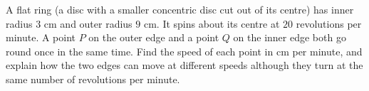 A flat ring (a disc with a smaller concentric disc cut out of its centre) has inner radius $3$ cm and outer radius $9$ cm. It spins about its centre at $20$ revolutions per minute. A point $P$ on the outer edge and a point $Q$ on the inner edge both go round once in the same time. Find the speed of each point in cm per minute, and explain how the two edges can move at different speeds although they turn at the same number of revolutions per minute.
